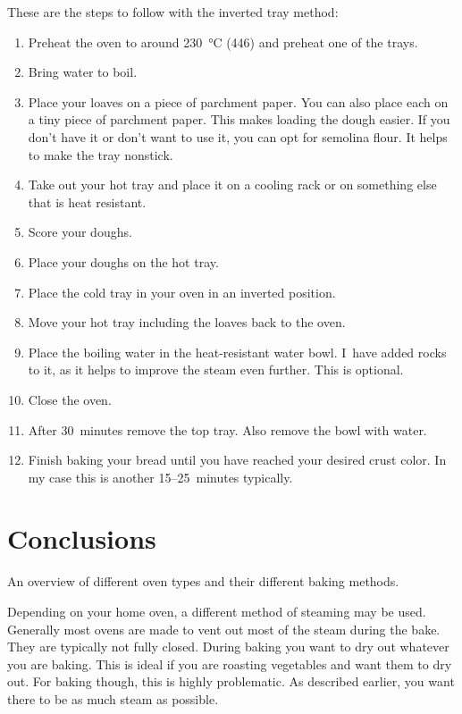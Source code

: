 These are the steps to follow with the inverted tray method:
\begin{enumerate}
\item Preheat the oven to around  \qty{230}{\degreeCelsius} (\qty{446}{\degF}) and
preheat one of the trays.
\item Bring water to boil.
\item Place your loaves on a piece of parchment paper. You
can also place each on a tiny piece of parchment paper.
This makes loading the dough easier. If you don't
have it or don't want to use it, you can opt for
semolina flour. It helps to make the tray nonstick.
\item Take out your hot tray and place it
on a cooling rack or on something else that
is heat resistant.
\item Score your doughs.
\item Place your doughs on the hot tray.
\item Place the cold tray in your oven in an inverted position.
\item Move your hot tray including the loaves back
to the oven.
\item Place the boiling water in the heat-resistant
water bowl. I~have added rocks to it, as it helps
to improve the steam even further. This is optional.
\item Close the oven.
\item After 30~minutes remove the top tray. Also remove the bowl with water.
\item Finish baking your bread until you have reached your desired
crust color. In my case this is another 15--25~minutes typically.
\end{enumerate}

\section{Conclusions}

\begin{table}[!htb]
    \centering
        
        \caption[Different oven types]{An overview of different oven types and their
            different baking methods.}
\end{table}

Depending on your home oven, a different method
of steaming may be used. Generally most ovens
are made to vent out most of the steam during the
bake. They are typically not fully closed. During
baking you want to dry out whatever you are baking.
This is ideal if you are roasting vegetables and
want them to dry out. For baking though, this is
highly problematic. As described earlier, you
want there to be as much steam as possible.

